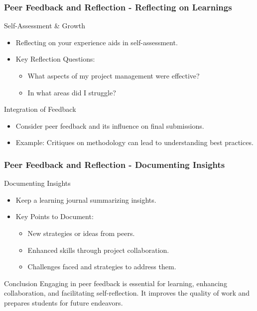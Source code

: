 \documentclass[aspectratio=169]{beamer}
\begin{document}
\begin{frame}[fragile]
    \frametitle{Peer Feedback and Reflection - Reflecting on Learnings}
    \begin{block}{Self-Assessment \& Growth}
        \begin{itemize}
            \item Reflecting on your experience aids in self-assessment.
            \item Key Reflection Questions:
            \begin{itemize}
                \item What aspects of my project management were effective?
                \item In what areas did I struggle?
            \end{itemize}
        \end{itemize}
    \end{block}

    \begin{block}{Integration of Feedback}
        \begin{itemize}
            \item Consider peer feedback and its influence on final submissions.
            \item Example: Critiques on methodology can lead to understanding best practices.
        \end{itemize}
    \end{block}
\end{frame}

\begin{frame}[fragile]
    \frametitle{Peer Feedback and Reflection - Documenting Insights}
    \begin{block}{Documenting Insights}
        \begin{itemize}
            \item Keep a learning journal summarizing insights.
            \item Key Points to Document:
            \begin{itemize}
                \item New strategies or ideas from peers.
                \item Enhanced skills through project collaboration.
                \item Challenges faced and strategies to address them.
            \end{itemize}
        \end{itemize}
    \end{block}

    \begin{block}{Conclusion}
        Engaging in peer feedback is essential for learning, enhancing collaboration, and facilitating self-reflection. It improves the quality of work and prepares students for future endeavors.
    \end{block}
\end{frame}
\end{document}
